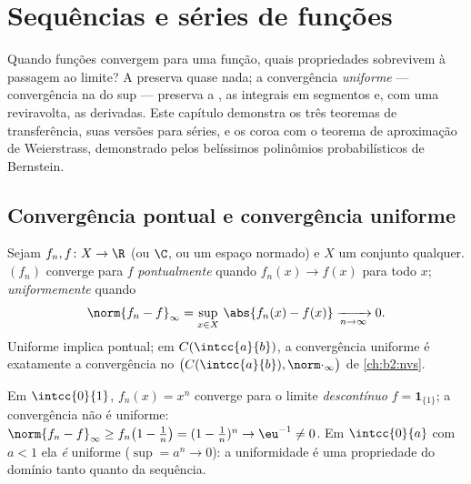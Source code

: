 \chapter{Sequências e séries de funções}\label{ch:b2:funcseq}

Quando funções convergem para uma função, quais propriedades sobrevivem à
passagem ao limite? A  preserva quase
nada; a convergência \emph{uniforme} --- convergência na  do sup
--- preserva a , as integrais em segmentos e, com uma reviravolta,
as derivadas. Este capítulo demonstra os três teoremas de transferência,
suas versões para séries, e os coroa com o teorema de aproximação
de Weierstrass, demonstrado pelos belíssimos polinômios probabilísticos
de Bernstein.

\section{Convergência pontual e convergência uniforme}

\begin{definition}\label{def:b2:funcseq:def}
Sejam $f_n, f \colon X \to \R$ (ou $\C$, ou um espaço normado) e $X$ um
conjunto qualquer. $(f_n)$ converge para $f$
\emph{pontualmente} quando $f_n(x) \to
f(x)$ para todo $x$; \emph{uniformemente}
quando
\[
\norm{f_n - f}_\infty = \sup_{x \in X}\, \abs{f_n(x) - f(x)}
\xrightarrow[n \to \infty]{} 0 .
\]
Uniforme implica pontual; em $C(\intcc{a}{b})$, a convergência uniforme
é exatamente a convergência no 
$\bigl(C(\intcc{a}{b}), \norm\cdot_\infty\bigr)$ de
\cref{ch:b2:nvs}.
\end{definition}

\begin{example}\label{ex:b2:funcseq:xn}
Em $\intcc{0}{1}$, $f_n(x) = x^n$ converge  para o limite
\emph{descontínuo} $f = \mathbf{1}_{\{1\}}$; a convergência
não é uniforme: $\norm{f_n - f}_\infty \geq f_n\bigl(1 -
\tfrac1n\bigr) = (1 - \tfrac1n)^n \to \eu^{-1} \neq 0$. Em
$\intcc{0}{a}$ com $a < 1$ ela \emph{é} uniforme ($\sup = a^n \to
0$): a uniformidade é uma propriedade do domínio tanto quanto da
sequência.
\end{example}


